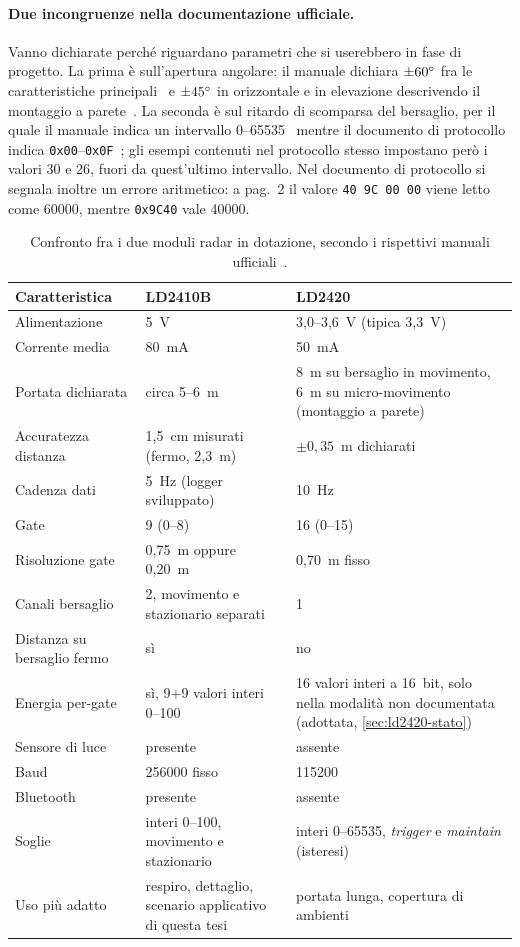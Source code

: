 \paragraph{Due incongruenze nella documentazione ufficiale.} Vanno dichiarate
perché riguardano parametri che si userebbero in fase di progetto. La prima è
sull'apertura angolare: il manuale dichiara $\pm 60\degree$ fra le caratteristiche
principali~\cite[§1.1]{hilinkManualLD2420} e $\pm 45\degree$ in orizzontale e in
elevazione descrivendo il montaggio a parete~\cite[§5.2]{hilinkManualLD2420}. La
seconda è sul ritardo di scomparsa del bersaglio, per il quale il manuale indica
un intervallo 0--65535~\cite[§4.2.1]{hilinkManualLD2420} mentre il documento di
protocollo indica \texttt{0x00}--\texttt{0x0F}~\cite[Tab.~2]{hilinkProtoLD2420};
gli esempi contenuti nel protocollo stesso impostano però i valori 30 e 26, fuori
da quest'ultimo intervallo. Nel documento di protocollo si segnala inoltre un
errore aritmetico: a pag.~2 il valore \texttt{40 9C 00 00} viene letto come 60000,
mentre \texttt{0x9C40} vale 40000.

\begin{table}[htbp]
\centering
\caption{Confronto fra i due moduli radar in dotazione, secondo i rispettivi
manuali ufficiali~\cite{hilinkManualV104,hilinkManualLD2420}.}
\label{tab:confronto-moduli}
\small
\begin{tabularx}{\linewidth}{@{}lXX@{}}
\toprule
\textbf{Caratteristica} & \textbf{LD2410B} & \textbf{LD2420} \\
\midrule
Alimentazione & 5~V & 3,0--3,6~V (tipica 3,3~V) \\
Corrente media & 80~mA & 50~mA \\
Portata dichiarata & circa 5--6~m & 8~m su bersaglio in movimento, 6~m su
  micro-movimento (montaggio a parete) \\
Accuratezza distanza & 1,5~cm misurati (fermo, 2,3~m) & $\pm 0,35$~m dichiarati \\
Cadenza dati & 5~Hz (logger sviluppato) & 10~Hz \\
Gate & 9 (0--8) & 16 (0--15) \\
Risoluzione gate & 0,75~m oppure 0,20~m & 0,70~m fisso \\
Canali bersaglio & 2, movimento e stazionario separati & 1 \\
Distanza su bersaglio fermo & sì & no \\
Energia per-gate & sì, 9+9 valori interi 0--100 & 16 valori interi a 16~bit, solo nella
  modalità non documentata (adottata, \cref{sec:ld2420-stato}) \\
Sensore di luce & presente & assente \\
Baud & 256000 fisso & 115200 \\
Bluetooth & presente & assente \\
Soglie & interi 0--100, movimento e stazionario & interi 0--65535,
  \emph{trigger} e \emph{maintain} (isteresi) \\
Uso più adatto & respiro, dettaglio, scenario applicativo di questa tesi &
  portata lunga, copertura di ambienti \\
\bottomrule
\end{tabularx}
\end{table}

